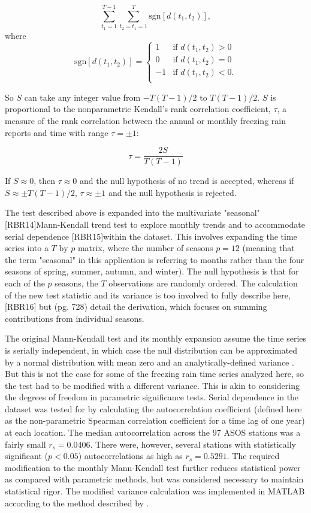 \documentclass[twocol]{ametsoc}
\begin{document}
\[\sum_{t_1=1}^{T-1}\sum_{t_2=t_1=1}^T\text{sgn}[d(t_1,t_2)],\] where\\
\[\text{sgn}[d(t_1,t_2)]=\begin{cases} 1 & \text{if } d(t_1,t_2)>0\\ 0 & \text{if } d(t_1,t_2)=0\\ -1 & \text{if } d(t_1,t_2)<0.\\ \end{cases}\]

So $S$ can take any integer value from $-T(T-1)/2$ to $T(T-1)/2$. $S$ is proportional to the nonparametric Kendall's rank correlation coefficient, $\tau$, a measure of the rank correlation between the annual or monthly freezing rain reports and time with range $\tau=\pm1$:

\[\tau=\frac{2S}{T(T-1)}\]

If $S\approx0$, then $\tau\approx0$ and the null hypothesis of no trend is accepted, whereas if  $S\approx\pm T(T-1)/2$, $\tau\approx\pm1$ and the null hypothesis is rejected. 

The test described above is expanded into the multivariate "seasonal" [RBR14]Mann-Kendall trend test to explore monthly trends and to accommodate serial dependence [RBR15]within the dataset. This involves expanding the time series into a $T\text{ by }p$ matrix, where the number of seasons $p=12$ (meaning that the term "seasonal" in this application is referring to months rather than the four seasons of spring, summer, autumn, and winter). The null hypothesis is that for each of the $p$ seasons, the $T$ observations are randomly ordered. The calculation of the new test statistic and its variance is too involved to fully describe here,[RBR16] but \citet{hirsch1984nonparametric} (pg. 728) detail the derivation, which focuses on summing contributions from individual seasons.

The original Mann-Kendall test and its monthly expansion assume the time series is serially independent, in which case the null distribution can be approximated by a normal distribution with mean zero and an analytically-defined variance \citep{kendall1955rank}. But this is not the case for some of the freezing rain time series analyzed here, so the test had to be modified with a different variance. This is akin to considering the degrees of freedom in parametric significance tests. Serial dependence in the dataset was tested for by calculating the autocorrelation coefficient (defined here as the non-parametric Spearman correlation coefficient for a time lag of one year) at each location. The median autocorrelation across the 97 ASOS stations was a fairly small $r_s = 0.0406$.  There were, however, several stations with statistically significant ($p<0.05$) autocorrelations as high as $r_s = 0.5291$. The required modification to the monthly Mann-Kendall test further reduces statistical power as compared with parametric methods, but was considered necessary to maintain statistical rigor. The modified variance calculation was implemented in MATLAB according to the method described by \citet{hirsch1984nonparametric}.
\end{document}
